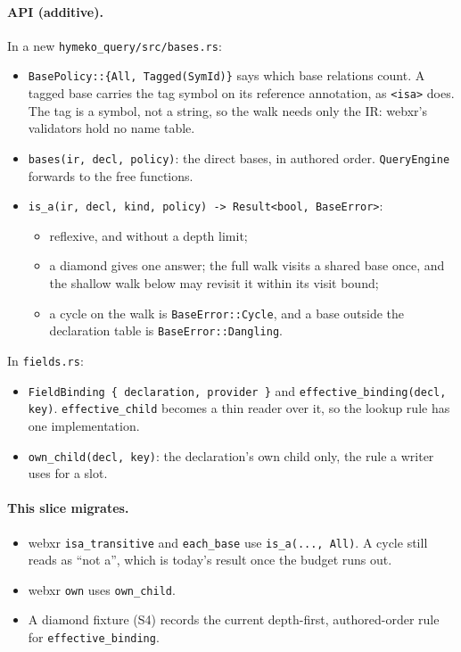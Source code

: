 \documentclass[11pt,a4paper]{article}
\newcommand{\code}[1]{\texttt{#1}}
\begin{document}
\paragraph{API (additive).} In a new \code{hymeko\_query/src/bases.rs}:
\begin{itemize}[nosep]
\item \code{BasePolicy::\{All, Tagged(SymId)\}} says which base relations count. A tagged base
  carries the tag symbol on its reference annotation, as \code{<isa>} does. The tag is a symbol, not
  a string, so the walk needs only the IR: webxr's validators hold no name table.
\item \code{bases(ir, decl, policy)}: the direct bases, in authored order. \code{QueryEngine}
  forwards to the free functions.
\item \code{is\_a(ir, decl, kind, policy) -> Result<bool, BaseError>}:
  \begin{itemize}[nosep]
  \item reflexive, and without a depth limit;
  \item a diamond gives one answer; the full walk visits a shared base once, and the shallow walk
    below may revisit it within its visit bound;
  \item a cycle on the walk is \code{BaseError::Cycle}, and a base outside the declaration table is
    \code{BaseError::Dangling}.
  \end{itemize}
\end{itemize}
In \code{fields.rs}:
\begin{itemize}[nosep]
\item \code{FieldBinding \{ declaration, provider \}} and \code{effective\_binding(decl, key)}.
  \code{effective\_child} becomes a thin reader over it, so the lookup rule has one
  implementation.
\item \code{own\_child(decl, key)}: the declaration's own child only, the rule a writer uses for a
  slot.
\end{itemize}

\paragraph{This slice migrates.}
\begin{itemize}[nosep]
\item webxr \code{isa\_transitive} and \code{each\_base} use \code{is\_a(..., All)}. A cycle
  still reads as ``not a'', which is today's result once the budget runs out.
\item webxr \code{own} uses \code{own\_child}.
\item A diamond fixture (S4) records the current depth-first, authored-order rule for
  \code{effective\_binding}.
\end{itemize}
\end{document}
